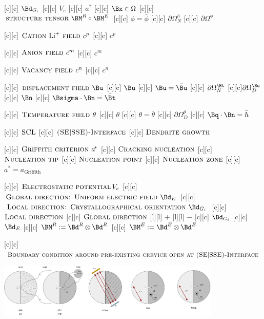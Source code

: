 [c][c] {$\Bd_{G_{i}}$}
[c][c] {$V_{e}$}
[c][c]   {\scriptsize $a^{\!\ast}$}
[c][c] {$\Bx \in \Omega$}
[c][c] {$\textsc{structure tensor } \BM^{R} \circ \BM^{E}$}
[c][c] {$\phi=\bar{\phi}$}
[c][c] {$\partial\Omega^{h}_{N}$}
[c][c] {$\partial\Omega^{\phi}$}

[c][c]  {\scriptsize $\textsc{Cation } \text{Li}^{+}
		\textsc{ field }  c^{p}$}
[c][c]  {$c^{p}$}

[c][c] {\scriptsize $\textsc{Anion field } c^{m}$}
[c][c]  {$c^{m}$}

[c][c]   {\scriptsize $\textsc{Vacancy field } c^{n}$}
[c][c]  {$c^{n}$}

[c][c] {\scriptsize $\textsc{displacement field } \Bu$}
[c][c]   {$\Bu$}
[c][c] {$\Bu=\bar{\Bu}$}
[c][c]  {$\partial\Omega^{\Bt}_{N}$}
[c][c]{$\partial\Omega^{\Bu}_{D}$}
[c][c]    {$\Bn$}
[c][c] {$\Bsigma\cdot\Bn = \bar{\Bt}$}

[c][c]  {\scriptsize $\textsc{Temperature field } \theta$}
[c][c]    {$\theta$}
[c][c] {$\theta = \bar{\theta}$}
[c][c]  {$\partial\Omega^{\theta}_{D}$}
[c][c]  {$\Bq\cdot\Bn = \bar{h}$}

[c][c] {\scriptsize $\textsc{SCL}$}
[c][c]  {\tiny $\textsc{(SE$|$SSE)-Interface}$}
[c][c] {\tiny $\textsc{Dendrite growth}$}

[c][c] {\scriptsize $\textsc{Griffith criterion } a^{\!\ast}$}
[c][c] {\tiny $\textsc{Cracking nucleation}$}
[c][c] {\tiny $\textsc{Nucleation tip}$}
[c][c] {\tiny $\textsc{Nucleation point}$}
[c][c] {\tiny $\textsc{Nucleation zone}$}
[c][c] {\tiny $a^{\!\ast}\!\!=\!a_{\text{Griffith}}$}

[c][c] {\scriptsize $\textsc{Electrostatic potential}\, V_{e}$}
[c][c] {\tiny $\textsc{Global direction: Uniform electric field } \Bd_{E}$}
[c][c] {\tiny $\textsc{Local direction:  Crystallographical orientation } \Bd_{G_{i}}$}
[c][c] {\tiny $\textsc{Local direction}$}
[c][c] {\tiny $\textsc{Global direction}$}
[l][l] {$+$}
[l][l] {$-$}
[c][c] {\tiny $\Bd_{G_{i}}$}
[c][c] {\tiny $\Bd_{E}$}
[c][c] {$\BM^{R} := \Bd^{R} \otimes \Bd^{R}$}
[c][c] {$\BM^{E} := \Bd^{E} \otimes \Bd^{E}$}

[c][c] {\scriptsize $\textsc{Boundary condition around pre-existing crevice open at (SE$|$SSE)-Interface}$}

\includegraphics[width=0.8\textwidth]{structuralfivefields_multi_edited.eps}